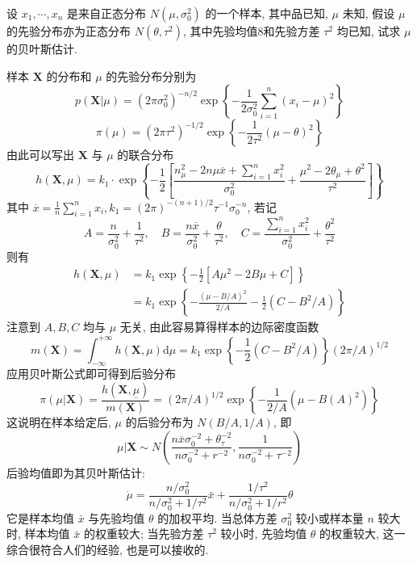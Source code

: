 \begin{example}\label{exam:6.4.3}
设 $x_{1}, \cdots, x_{n}$ 是来自正态分布 $N\left(\mu, \sigma_{0}^{2}\right)$ 的一个样本, 其中品已知, $\mu$ 未知, 假设 $\mu$ 的先验分布亦为正态分布 $N\left(\theta, \tau^{2}\right)$, 其中先验均值8和先验方差 $\tau^2$ 均已知, 试求 $\mu$ 的贝叶斯估计.
\end{example}\begin{solution}
样本 $\boldsymbol X$ 的分布和 $\mu$ 的先验分布分别为
\[p(\boldsymbol{X} | \mu)=\left(2 \pi \sigma_{0}^{2}\right)^{-n / 2} \exp \left\{-\frac{1}{2 \sigma_{0}^{2}} \sum_{i=1}^{n}\left(x_{i}-\mu\right)^{2}\right\}\]
\[\pi(\mu)=\left(2 \pi \tau^{2}\right)^{-1 / 2} \exp \left\{-\frac{1}{2 \tau^{2}}(\mu-\theta)^{2}\right\}\]
由此可以写出 $\boldsymbol X$ 与 $\mu$ 的联合分布
\[h(\boldsymbol{X}, \mu)=k_{1} \cdot \exp \left\{-\frac{1}{2}\left[\frac{n_{\mu}^{2}-2 n \mu \overline{x}+\sum_{i=1}^{n} x_{i}^{2}}{\sigma_{0}^{2}}+\frac{\mu^{2}-2 \theta_{\mu}+\theta^{2}}{\tau^{2}}\right]\right\}\]
其中 $\overline{x}=\frac{1}{n} \sum_{i=1}^{n} x_{i}, k_{1}=(2 \pi)^{-(n+1) / 2} \tau^{-1} \sigma_{0}^{-n}$, 若记
\[A=\frac{n}{\sigma_{0}^{2}}+\frac{1}{\tau^{2}}, \quad B=\frac{n \overline{x}}{\sigma_{0}^{2}}+\frac{\theta}{\tau^{2}}, \quad C=\frac{\sum_{i=1}^{n} x_{i}^{2}}{\sigma_{0}^{2}}+\frac{\theta^{2}}{\tau^{2}}\]
则有
\begin{align*} h(\boldsymbol{X}, \mu) &=k_{1} \exp \left\{-\frac{1}{2}\left[A \mu^{2}-2 B\mu+C\right]\right \} \\ &=k_{1} \exp \left\{-\frac{(\mu-B / A)^{2}}{2 / A}-\frac{1}{2}\left(C-B^{2} / A\right)\right\} \end{align*}
注意到 $A,B,C$ 均与 $\mu$ 无关, 由此容易算得样本的边际密度函数
\[m(\boldsymbol{X})=\int_{-\infty}^{+\infty} h(\boldsymbol{X}, \mu) \mathrm{d}\mu=k_{1} \exp \left\{-\frac{1}{2}\left(C-B^{2} / A\right)\right\}(2 \pi / A)^{1 / 2}\]
应用贝叶斯公式即可得到后验分布
\[\pi(\mu|\boldsymbol{X})=\frac{h(\boldsymbol{X}, \underline{\mu})}{m(\boldsymbol{X})}=(2 \pi / A)^{1 / 2} \exp \left\{-\frac{1}{2 / A}\left(\mu-B(A)^{2}\right)\right\}\]
这说明在样本给定后, $\mu$ 的后验分布为 $N(B/A,1/A)$, 即
\[\mu | \mathbf{X} \sim N\left(\frac{n \overline{x} \sigma_{0}^{-2}+\theta_{\tau}^{-2}}{n \sigma_{0}^{-2}+r^{-2}}, \frac{1}{n \sigma_{0}^{-2}+\tau^{-2}}\right)\]
后验均值即为其贝叶斯估计:
\[\dot{\mu}=\frac{n / \sigma_{0}^{2}}{n / \sigma_{0}^{2}+1 / \tau^{2}} \bar{x}+\frac{1 / \tau^{2}}{n / \sigma_{0}^{2}+1 / r^{2}} \theta\]
它是样本均值 $\bar x$ 与先验均值 $\theta$ 的加权平均. 当总体方差 $\sigma_0^2$ 较小或样本量 $n$ 较大时, 样本均值 $\bar x$ 的权重较大; 当先验方差 $\tau^2$ 较小时, 先验均值 $\theta$ 的权重较大, 这一综合很符合人们的经验, 也是可以接收的.
\end{solution}

